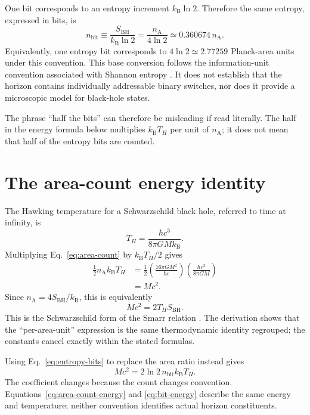 \documentclass[12pt]{article}
\begin{document}
One bit corresponds to an entropy increment $k_{\mathrm B}\ln2$. Therefore the same entropy, expressed in bits, is
\begin{equation}
  n_{\mathrm{bit}}\equiv\frac{S_{\mathrm{BH}}}{k_{\mathrm B}\ln2}
  =\frac{n_{\mathrm A}}{4\ln2}
  \simeq0.360674\,n_{\mathrm A}.
  \label{eq:entropy-bits}
\end{equation}
Equivalently, one entropy bit corresponds to $4\ln2\simeq2.77259$ Planck-area units under this convention. This base conversion follows the information-unit convention associated with Shannon entropy \cite{Shannon}. It does not establish that the horizon contains individually addressable binary switches, nor does it provide a microscopic model for black-hole states.

The phrase ``half the bits'' can therefore be misleading if read literally. The half in the energy formula below multiplies $k_{\mathrm B}T_H$ per unit of $n_{\mathrm A}$; it does not mean that half of the entropy bits are counted.

\section{The area-count energy identity}

The Hawking temperature for a Schwarzschild black hole, referred to time at infinity, is \cite{Hawking}
\begin{equation}
  T_H=\frac{\hbar c^3}{8\pi G M k_{\mathrm B}}.
  \label{eq:hawking-temperature}
\end{equation}
Multiplying Eq.~\eqref{eq:area-count} by $k_{\mathrm B}T_H/2$ gives
\begin{align}
  \frac{1}{2}n_{\mathrm A}k_{\mathrm B}T_H
  &=\frac{1}{2}
    \left(\frac{16\pi G M^2}{\hbar c}\right)
    \left(\frac{\hbar c^3}{8\pi G M}\right) \\
  &=Mc^2.
  \label{eq:area-count-energy}
\end{align}
Since $n_{\mathrm A}=4S_{\mathrm{BH}}/k_{\mathrm B}$, this is equivalently
\begin{equation}
  Mc^2=2T_HS_{\mathrm{BH}}.
  \label{eq:smarr}
\end{equation}
This is the Schwarzschild form of the Smarr relation \cite{Smarr}. The derivation shows that the ``per-area-unit'' expression is the same thermodynamic identity regrouped; the constants cancel exactly within the stated formulas.

Using Eq.~\eqref{eq:entropy-bits} to replace the area ratio instead gives
\begin{equation}
  Mc^2=2\ln2\,n_{\mathrm{bit}}k_{\mathrm B}T_H.
  \label{eq:bit-energy}
\end{equation}
The coefficient changes because the count changes convention. Equations~\eqref{eq:area-count-energy} and \eqref{eq:bit-energy} describe the same energy and temperature; neither convention identifies actual horizon constituents.
\end{document}
